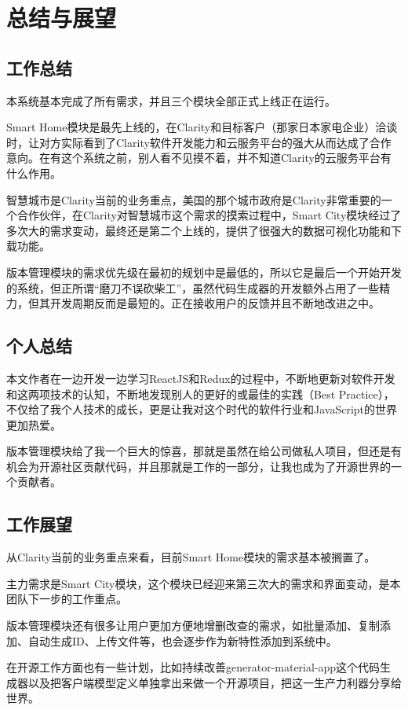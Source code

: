 

\chapter{总结与展望}
\label{chap:summary}
\section{工作总结}
本系统基本完成了所有需求，并且三个模块全部正式上线正在运行。

Smart Home模块是最先上线的，在Clarity和目标客户（那家日本家电企业）洽谈时，让对方实际看到了Clarity软件开发能力和云服务平台的强大从而达成了合作意向。在有这个系统之前，别人看不见摸不着，并不知道Clarity的云服务平台有什么作用。

智慧城市是Clarity当前的业务重点，美国的那个城市政府是Clarity非常重要的一个合作伙伴，在Clarity对智慧城市这个需求的摸索过程中，Smart City模块经过了多次大的需求变动，最终还是第二个上线的，提供了很强大的数据可视化功能和下载功能。

版本管理模块的需求优先级在最初的规划中是最低的，所以它是最后一个开始开发的系统，但正所谓“磨刀不误砍柴工”，虽然代码生成器的开发额外占用了一些精力，但其开发周期反而是最短的。正在接收用户的反馈并且不断地改进之中。
\section{个人总结}
本文作者在一边开发一边学习ReactJS和Redux的过程中，不断地更新对软件开发和这两项技术的认知，不断地发现别人的更好的或最佳的实践（Best Practice），不仅给了我个人技术的成长，更是让我对这个时代的软件行业和JavaScript的世界更加热爱。

版本管理模块给了我一个巨大的惊喜，那就是虽然在给公司做私人项目，但还是有机会为开源社区贡献代码，并且那就是工作的一部分，让我也成为了开源世界的一个贡献者。
\section{工作展望}
从Clarity当前的业务重点来看，目前Smart Home模块的需求基本被搁置了。

主力需求是Smart City模块，这个模块已经迎来第三次大的需求和界面变动，是本团队下一步的工作重点。

版本管理模块还有很多让用户更加方便地增删改查的需求，如批量添加、复制添加、自动生成ID、上传文件等，也会逐步作为新特性添加到系统中。

在开源工作方面也有一些计划，比如持续改善generator-material-app这个代码生成器以及把客户端模型定义单独拿出来做一个开源项目，把这一生产力利器分享给世界。
